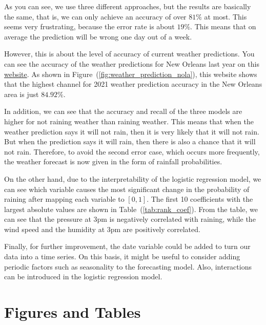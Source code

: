 \documentclass[11pt, a4paper, jou]{apa7}
\begin{document}
As you can see, we use three different approaches, but the results are basically the same, that is, we can only achieve an accuracy of over $81\%$ at most. This seems very frustrating, because the error rate is about $19\%$. This means that on average the prediction will be wrong one day out of a week. 

However, this is about the level of accuracy of current weather predictions. You can see the accuracy of the weather predictions for New Orleans last year on this \href{https://www.forecastadvisor.com/Louisiana/NewOrleans/70112/}{website}. As shown in Figure~(\ref{fig:weather_prediction_nola}), this website shows that the highest channel for 2021 weather prediction accuracy in the New Orleans area is just $84.92\%$. 

In addition, we can see that the accuracy and recall of the three models are higher for not raining weather than raining weather. This means that when the weather prediction says it will not rain, then it is very likely that it will not rain. But when the prediction says it will rain, then there is also a chance that it will not rain. Therefore, to avoid the second error case, which occurs more frequently, the weather forecast is now given in the form of rainfall probabilities. 

On the other hand, due to the interpretability of the logistic regression model, we can see which variable causes the most significant change in the probability of raining after mapping each variable to $[0,1]$. The first 10 coefficients with the largest absolute values are shown in Table~(\ref{tab:rank_coef}). From the table, we can see that the pressure at 3pm is negatively correlated with raining, while the wind speed and the humidity at 3pm are positively correlated. 

Finally, for further improvement, the date variable could be added to turn our data into a time series. On this basis, it might be useful to consider adding periodic factors such as seasonality to the forecasting model. Also, interactions can be introduced in the logistic regression model. 

\printbibliography 
\clearpage
\appendix
\section{Figures and Tables}
\end{document}
